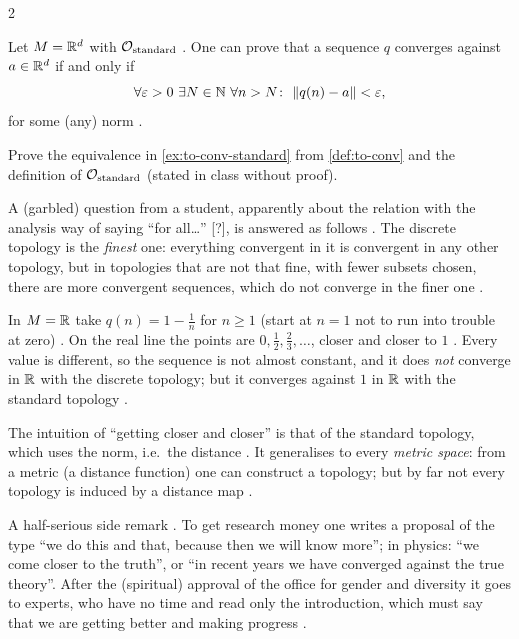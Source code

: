 \begin{paracol}{2}
\begin{example}\label{ex:to-conv-standard}
Let $M=\mathbb{R}^d$ with $\mathcal O_{\rm standard}$ . One can prove that a sequence $q$ converges against $a\in\mathbb{R}^d$
if and only if
\[
  \forall\varepsilon>0\ \exists N\in\mathbb{N}\ \forall n>N\colon\ \|q(n)-a\|<\varepsilon,
\]
for some (any) norm .
\end{example}
\begin{exercise}\label{ex:to-conv-eps}
Prove the equivalence in \cref{ex:to-conv-standard} from \cref{def:to-conv} and the definition of $\mathcal O_{\rm standard}$
(stated in class without proof).
\end{exercise}
A (garbled) question from a student, apparently about the relation with the analysis way of saying ``for all\dots'' [?], is answered
as follows . The discrete topology is the \emph{finest} one: everything convergent in it is convergent
in any other topology, but in topologies that are not that fine, with fewer subsets chosen, there are more convergent
sequences, which do not converge in the finer one .

\begin{example}[$q(n)=1-1/n$]\label{ex:to-conv-1n}
In $M=\mathbb{R}$ take $q(n)=1-\frac1n$ for $n\ge1$ (start at $n=1$ not to run into trouble at zero) . On the real line the
points are $0,\frac12,\frac23,\dots$, closer and closer to $1$ . Every value is different, so the sequence is not almost constant, and
it does \emph{not} converge in $\mathbb{R}$ with the discrete topology; but it converges against $1$ in $\mathbb{R}$ with the standard
topology .
\end{example}
The intuition of ``getting closer and closer'' is that of the standard topology, which uses the norm, i.e.\ the distance
. It generalises to every \emph{metric space}: from a metric (a distance function) one can construct a
topology; but by far not every topology is induced by a distance map .

\begin{secondary}
A half-serious side remark . To get research money one writes a proposal of the type ``we do this
and that, because then we will know more''; in physics: ``we come closer to the truth'', or ``in recent years we have converged
against the true theory''. After the (spiritual) approval of the office for gender and diversity it goes to experts, who have no time
and read only the introduction, which must say that we are getting better and making progress
.


\end{secondary}
\end{paracol}
